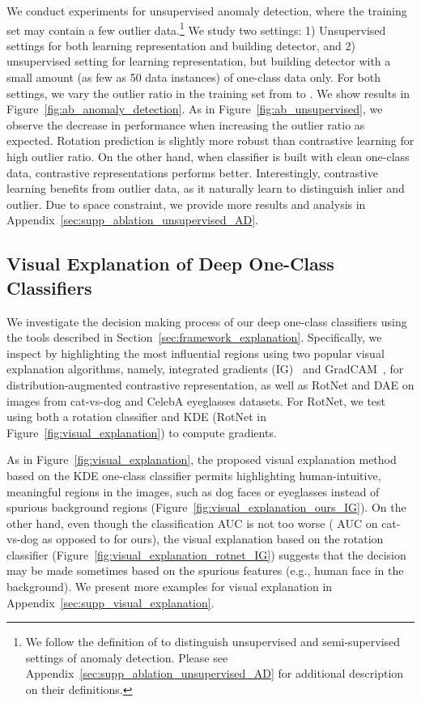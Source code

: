 \documentclass{article} \usepackage{iclr2021_conference,times}
\begin{document}
We conduct experiments for unsupervised anomaly detection, where the training set may contain a few outlier data.\footnote{We follow the definition of \cite{chandola2009anomaly} to distinguish unsupervised and semi-supervised settings of anomaly detection. Please see Appendix~\ref{sec:supp_ablation_unsupervised_AD} for additional description on their definitions.} We study two settings: 1) Unsupervised settings for both learning representation and building detector, and 2) unsupervised setting for learning representation, but building detector with a small amount (as few as 50 data instances) of one-class data only. For both settings, we vary the outlier ratio in the training set from  to . We show results in Figure~\ref{fig:ab_anomaly_detection}. As in Figure~\ref{fig:ab_unsupervised}, we observe the decrease in performance when increasing the outlier ratio as expected. Rotation prediction is slightly more robust than contrastive learning for high outlier ratio. On the other hand, when classifier is built with clean one-class data, contrastive representations performs better. Interestingly, contrastive learning benefits from outlier data, as it naturally learn to distinguish inlier and outlier. Due to space constraint, we provide more results and analysis in Appendix~\ref{sec:supp_ablation_unsupervised_AD}. 


\vspace{-0.05in}
\subsection{Visual Explanation of Deep One-Class Classifiers}
\label{sec:ablation_visual_explanation}
\vspace{-0.05in}

We investigate the decision making process of our deep one-class classifiers using the tools described in Section~\ref{sec:framework_explanation}. Specifically, we inspect by highlighting the most influential regions using two popular visual explanation algorithms, namely, integrated gradients (IG)~\citep{sundararajan2017axiomatic} and GradCAM~\citep{selvaraju2017grad}, for distribution-augmented contrastive representation, as well as RotNet and DAE on images from cat-vs-dog and CelebA eyeglasses datasets. For RotNet, we test using both a rotation classifier and KDE (RotNet in Figure~\ref{fig:visual_explanation}) to compute gradients.

As in Figure~\ref{fig:visual_explanation}, the proposed visual explanation method based on the KDE one-class classifier permits highlighting human-intuitive, meaningful regions in the images, such as dog faces or eyeglasses instead of spurious background regions (Figure~\ref{fig:visual_explanation_ours_IG}). On the other hand, even though the classification AUC is not too worse ( AUC on cat-vs-dog as opposed to  for ours), the visual explanation based on the rotation classifier (Figure~\ref{fig:visual_explanation_rotnet_IG}) suggests that the decision may be made sometimes based on the spurious features (e.g., human face in the background). We present more examples for visual explanation in Appendix~\ref{sec:supp_visual_explanation}.
\end{document}
